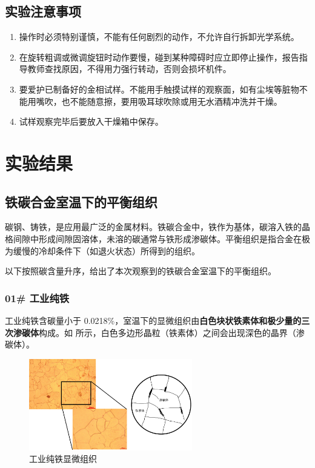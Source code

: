 \documentclass[a4paper,utf8]{article}
\begin{document}
    \subsection{实验注意事项}
        \begin{enumerate}
            \item 操作时必须特别谨慎，不能有任何剧烈的动作，不允许自行拆卸光学系统。
            \item 在旋转粗调或微调旋钮时动作要慢，碰到某种障碍时应立即停止操作，报告指导教师查找原因，不得用力强行转动，否则会损坏机件。
            \item 要爱护已制备好的金相试样。不能用手触摸试样的观察面，如有尘埃等脏物不能用嘴吹，也不能随意擦，要用吸耳球吹除或用无水酒精冲洗并干燥。
            \item 试样观察完毕后要放入干燥箱中保存。
        \end{enumerate}
\section{实验结果}
    \subsection{铁碳合金室温下的平衡组织}
        碳钢、铸铁，是应用最广泛的金属材料。铁碳合金中，铁作为基体，碳溶入铁的晶格间隙中形成间隙固溶体，未溶的碳通常与铁形成渗碳体。平衡组织是指合金在极为缓慢的冷却条件下（如退火状态）所得到的组织。\par
        以下按照碳含量升序，给出了本次观察到的铁碳合金室温下的平衡组织。
        \subsubsection{01# 工业纯铁}
            工业纯铁含碳量小于 0.0218\%，室温下的显微组织由\textbf{白色块状铁素体和极少量的三次渗碳体}构成。如 所示，白色多边形晶粒（铁素体）之间会出现深色的晶界（渗碳体）。
            \begin{figure}[!ht]
                \includegraphics[height=40mm]{result/1.pdf}
                \caption{工业纯铁显微组织\label{fig:1}}
            \end{figure}
\end{document}
